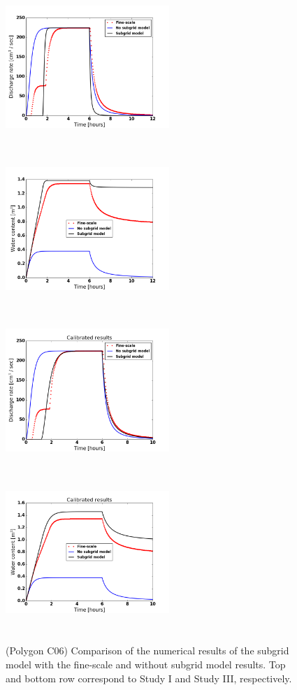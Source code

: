 \documentclass[review,11pt]{elsarticle}
\begin{document}
\begin{figure}
\centering
\includegraphics[width=6.2cm, height=6cm]{./figures/POLYGON06/POLYGON06discharge.png}
\includegraphics[width=6.2cm, height=6cm]{./figures/POLYGON06/POLYGON06watercontent.png}\\
\includegraphics[width=6.2cm, height=6cm]{./figures/POLYGON06/POLYGON06dischargeCalibDDManning.png}
\includegraphics[width=6.2cm, height=6cm]{./figures/POLYGON06/POLYGON06watercontentCalibDDManning.png}
\caption{(Polygon C06) Comparison of the numerical results of the subgrid model with the fine-scale and without subgrid model results. Top and bottom row correspond to Study I and Study III, respectively.}
\label{polygon-C06}
\end{figure}
\end{document}
